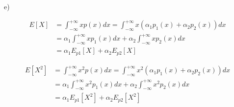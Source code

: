 e)

\begin{align*}
  E[X] &= \int_{-\infty}^{+\infty} xp(x)dx = \int_{-\infty}^{+\infty} x(\alpha_1 p_1(x) + \alpha_2 p_2(x)) dx \\
       &= \alpha_1 \int_{-\infty}^{+\infty} xp_1(x)dx + \alpha_2 \int_{-\infty}^{+\infty} xp_2(x)dx \\
       &= \alpha_1 E_{p1}[X] + \alpha_2 E_{p2}[X]
\end{align*}

\begin{align*}
  E[X^2] &= \int_{-\infty}^{+\infty} x^2p(x)dx = \int_{-\infty}^{+\infty} x^2(\alpha_1 p_1(x) + \alpha_2 p_2(x)) dx \\
       &= \alpha_1 \int_{-\infty}^{+\infty} x^2p_1(x)dx + \alpha_2 \int_{-\infty}^{+\infty} x^2p_2(x)dx \\
       &= \alpha_1 E_{p1}[X^2] + \alpha_2 E_{p2}[X^2]
\end{align*}

